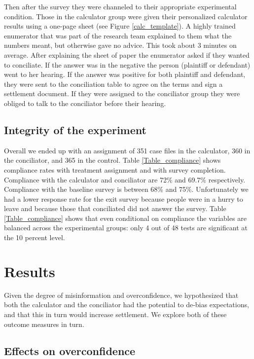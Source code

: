 \documentclass[11pt]{article}
\begin{document}
     Then after the survey they were channeled to their appropriate experimental condition. Those in the calculator group were given their personalized calculator results using a one-page sheet (see Figure \ref{calc_template}). A highly trained enumerator that was part of the research team explained to them what the numbers meant, but otherwise gave no advice. This took about 3 minutes on average. After explaining the sheet of paper the enumerator asked if they wanted to conciliate. If the answer was in the negative the person (plaintiff or defendant) went to her hearing. If the answer was positive for both plaintiff and defendant, they were sent to the conciliation table to agree on the terms and sign a settlement document. If they were assigned to the conciliator group they were obliged to talk to the conciliator before their hearing.
     
   
\subsection{Integrity of the experiment}

Overall we ended up with an assignment of 351 case files in the calculator, 360 in the conciliator, and 365 in the control. Table \ref{Table_compliance} shows compliance rates with treatment assignment and with survey completion. Compliance with the calculator and conciliator are 72\%  and 69.7\% respectively. Compliance with the baseline survey is between 68\% and 75\%. Unfortunately we had a lower response rate for the exit survey because people were in a hurry to leave and because those that conciliated did not answer the survey. Table \ref{Table_compliance} shows that even conditional on compliance the variables are balanced across the experimental groups: only 4 out of 48 tests are significant at the 10 percent level. 
     



\section{Results} \label{ResultsSection}

Given the degree of misinformation and overconfidence, we hypothesized that both the calculator and the conciliator had the potential to de-bias expectations, and that this in turn would increase settlement. We explore both of these outcome measures in turn.

\subsection{Effects on overconfidence}
\end{document}
